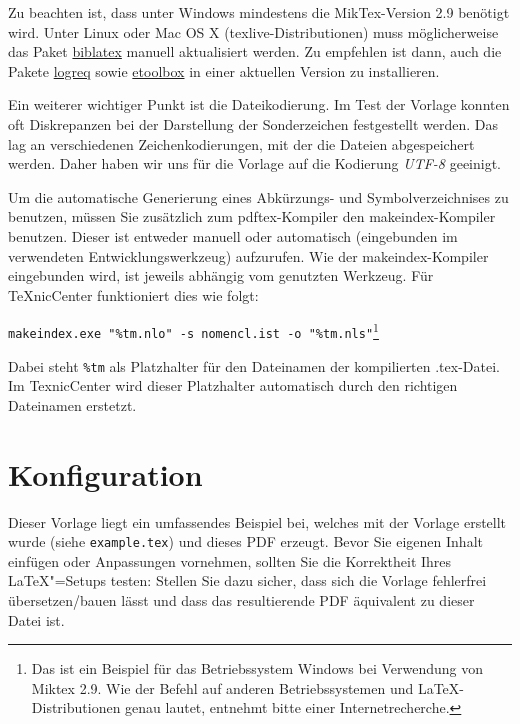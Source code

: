 Zu beachten ist, dass unter Windows mindestens die MikTex-Version 2.9 benötigt wird. Unter Linux oder Mac OS X (texlive-Distributionen) muss möglicherweise das Paket \href{http://ctan.org/tex-archive/macros/latex/contrib/biblatex}{biblatex} manuell aktualisiert werden. Zu empfehlen ist dann, auch die Pakete \href{http://ctan.org/tex-archive/macros/latex/contrib/logreq}{logreq} sowie \href{http://ctan.org/tex-archive/macros/latex/contrib/etoolbox}{etoolbox} in einer aktuellen Version zu installieren.

Ein weiterer wichtiger Punkt ist die Dateikodierung. Im Test der Vorlage konnten oft Diskrepanzen bei der Darstellung der Sonderzeichen festgestellt werden. Das lag an verschiedenen Zeichenkodierungen, mit der die Dateien abgespeichert werden. Daher haben wir uns für die Vorlage auf die Kodierung \emph{UTF-8} geeinigt.

Um die automatische Generierung eines Abkürzungs- und Symbolverzeichnises zu benutzen, müssen Sie zusätzlich zum pdftex-Kompiler den makeindex-Kompiler benutzen. Dieser ist entweder manuell oder automatisch (eingebunden im verwendeten Entwicklungswerkzeug) aufzurufen. Wie der makeindex-Kompiler eingebunden wird, ist jeweils abhängig vom genutzten Werkzeug. Für TeXnicCenter funktioniert dies wie folgt:

\noindent \begin{center} \verb|makeindex.exe "%tm.nlo" -s nomencl.ist -o "%tm.nls"|\footnote{Das ist ein Beispiel für das Betriebssystem Windows bei Verwendung von Miktex 2.9. Wie der Befehl auf anderen Betriebssystemen und \LaTeX-Distributionen genau lautet, entnehmt bitte einer Internetrecherche.}\end{center}

\noindent Dabei steht \verb|%tm| als Platzhalter für den Dateinamen der kompilierten .tex-Datei. Im TexnicCenter wird dieser Platzhalter automatisch durch den richtigen Dateinamen erstetzt.


\section{Konfiguration}

Dieser Vorlage liegt ein umfassendes Beispiel bei, welches mit der Vorlage erstellt wurde (siehe \verb-example.tex-) und
dieses PDF erzeugt. Bevor Sie eigenen Inhalt einfügen oder Anpassungen vornehmen, sollten Sie die Korrektheit Ihres
\LaTeX"=Setups testen: Stellen Sie dazu sicher, dass sich die Vorlage fehlerfrei übersetzen/bauen lässt und dass das
resultierende PDF äquivalent zu dieser Datei ist.


